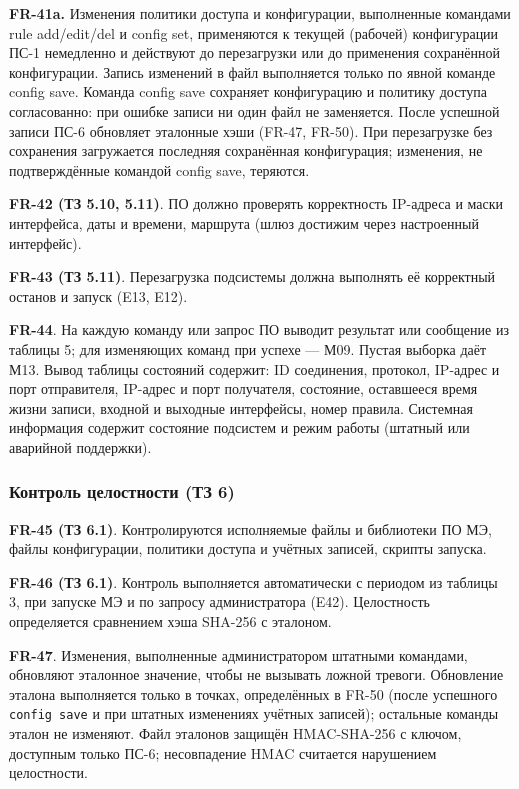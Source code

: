 \documentclass[13pt,a4paper,final]{article}
\begin{document}
	\textbf{FR-41a.} Изменения политики доступа и конфигурации, выполненные командами rule add/edit/del и config set, применяются к текущей (рабочей) конфигурации ПС-1 немедленно и действуют до перезагрузки или до применения сохранённой конфигурации. Запись изменений в файл выполняется только по явной команде config save. {Команда {config save} сохраняет конфигурацию и политику доступа согласованно:  при ошибке записи ни один файл не заменяется. После успешной записи ПС-6  обновляет эталонные хэши (FR-47, FR-50).} При перезагрузке без сохранения загружается последняя сохранённая конфигурация; изменения, не подтверждённые командой config save, теряются.
	
	\textbf{FR-42 (ТЗ 5.10, 5.11)}. ПО должно проверять корректность IP-адреса и маски интерфейса, даты и времени, маршрута (шлюз достижим через настроенный интерфейс).
	
	\textbf{FR-43 (ТЗ 5.11)}. Перезагрузка подсистемы должна выполнять её корректный останов и запуск (E13, E12).
	
	\textbf{FR-44}. На каждую команду или запрос ПО выводит результат или сообщение из таблицы 5; для изменяющих команд при успехе — М09. Пустая выборка даёт М13. {Вывод таблицы состояний содержит: ID соединения, протокол, IP-адрес и порт отправителя, IP-адрес и порт получателя, состояние, оставшееся время жизни записи, входной и выходные интерфейсы, номер правила.} Системная информация содержит состояние подсистем и режим работы (штатный или аварийной поддержки).
	
	\subsubsection{Контроль целостности (ТЗ 6)}
	
	\textbf{FR-45 (ТЗ 6.1)}. Контролируются исполняемые файлы и библиотеки ПО МЭ, файлы конфигурации, политики доступа и учётных записей, скрипты запуска.
	
	\textbf{FR-46 (ТЗ 6.1)}. Контроль выполняется автоматически с периодом из таблицы 3, при запуске МЭ и по запросу администратора (E42). Целостность определяется сравнением хэша SHA-256 с эталоном.
	
	\textbf{FR-47}. Изменения, выполненные администратором штатными командами, обновляют эталонное значение, чтобы не вызывать ложной тревоги. {Обновление эталона выполняется только в точках, определённых в FR-50 (после успешного \texttt{config save} и при штатных изменениях учётных записей); остальные команды эталон не изменяют.} Файл эталонов защищён HMAC-SHA-256 с ключом, доступным только ПС-6; несовпадение HMAC считается нарушением целостности.
	
\end{document}
